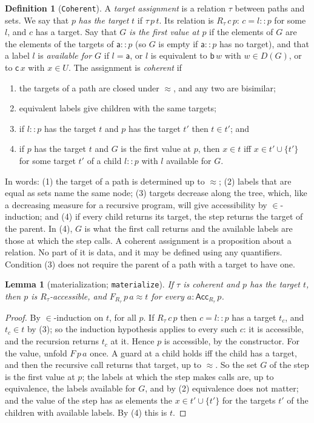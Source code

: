 \documentclass[10pt]{article}
\newtheorem{lemma}[theorem]{Lemma}
\theoremstyle{definition}
\newtheorem{definition}[theorem]{Definition}
\theoremstyle{remark}
\newcommand{\Acc}{\mathsf{Acc}}
\newcommand{\la}{\mathsf{a}}
\newcommand{\lb}{\mathsf{b}}
\newcommand{\lc}{\mathsf{c}}
\newcommand{\lean}[1]{\texttt{#1}}
\begin{document}
\begin{definition}[\lean{Coherent}]\label{def:coherent}
A \emph{target assignment} is a relation $\tau$ between paths and sets.
We say that $p$ \emph{has the target} $t$ if $\tau\,p\,t$. Its relation is
$R_\tau\,c\,p$: $c=l::p$ for some $l$, and $c$ has a target. Say that $G$
\emph{is the first value at $p$} if the elements of $G$ are the elements
of the targets of $\la::p$ (so $G$ is empty if $\la::p$ has no target),
and that a label $l$ is \emph{available for $G$} if $l=\la$, or $l$ is
equivalent to $\lb\,w$ with $w\in D(G)$, or to $\lc\,x$ with $x\in U$.
The assignment is \emph{coherent} if
\begin{enumerate}
\item the targets of a path are closed under $\approx$, and any two are
  bisimilar;
\item equivalent labels give children with the same targets;
\item if $l::p$ has the target $t$ and $p$ has the target $t'$ then
  $t\in t'$; and
\item if $p$ has the target $t$ and $G$ is the first value at $p$, then
  $x\in t$ iff $x\in t'\cup\{t'\}$ for some target $t'$ of a child $l::p$
  with $l$ available for $G$.
\end{enumerate}
\end{definition}

In words: (1) the target of a path is determined up to $\approx$; (2)
labels that are equal as sets name the same node; (3) targets decrease
along the tree, which, like a decreasing measure for a recursive
program, will give accessibility by $\in$-induction; and (4) if every
child returns its target, the step returns the target of the parent. In
(4), $G$ is what the first call returns and the available labels are
those at which the step calls. A coherent assignment is a proposition
about a relation. No part of it is data, and it may be defined using any
quantifiers. Condition (3) does not require the parent of a path with a
target to have one.

\begin{lemma}[materialization; \lean{materialize}]\label{lem:mat}
If $\tau$ is coherent and $p$ has the target $t$, then $p$ is
$R_\tau$-accessible, and $F_{R_\tau}\,p\,a\approx t$ for every $a:\Acc_{R_\tau}\,p$.
\end{lemma}
\begin{proof}
By $\in$-induction on $t$, for all $p$. If $R_\tau\,c\,p$ then $c=l::p$ has a
target $t_c$, and $t_c\in t$ by (3); so the induction hypothesis applies
to every such $c$: it is accessible, and the recursion returns $t_c$ at
it. Hence $p$ is accessible, by the constructor. For the value, unfold
$F\,p\,a$ once. A guard at a child holds iff the child has a target, and
then the recursive call returns that target, up to $\approx$. So the set
$G$ of the step is the first value at $p$; the labels at which the step
makes calls are, up to equivalence, the labels available for $G$, and by
(2) equivalence does not matter; and the value of the step has as
elements the $x\in t'\cup\{t'\}$ for the targets $t'$ of the children with
available labels. By (4) this is $t$.
\end{proof}
\end{document}
